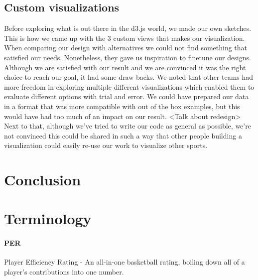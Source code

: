 \documentclass{sigchi}
\begin{document}
\subsection{Custom visualizations}
Before exploring what is out there in the d3.js world, we made our own sketches. This is how we came up with the 3 custom views that makes our visualization. When comparing our design with alternatives we could not find something that satisfied our needs. Nonetheless, they gave us inspiration to finetune our designs. Although we are satisfied with our result and we are convinced it was the right choice to reach our goal, it had some draw backs.
We noted that other teams had more freedom in exploring multiple different visualizations which enabled them to evaluate different options with trial and error. We could have prepared our data in a format that was more compatible with out of the box examples, but this would have had too much of an impact on our result.
<Talk about redesign>
Next to that, although we've tried to write our code as general as possible, we're not convinced this could be shared in such a way that other people building a visualization could easily re-use our work to visualize other sports.

\section{Conclusion}\label{sec:conclusion}


%
%
%
%
%
\balance{}

%
\printbibliography

\appendix
\section{Terminology}\label{sec:terminology}

\paragraph{PER} Player Efficiency Rating - An all-in-one basketball rating,
boiling down all of a player's contributions into one number\cite{per}.
\end{document}
